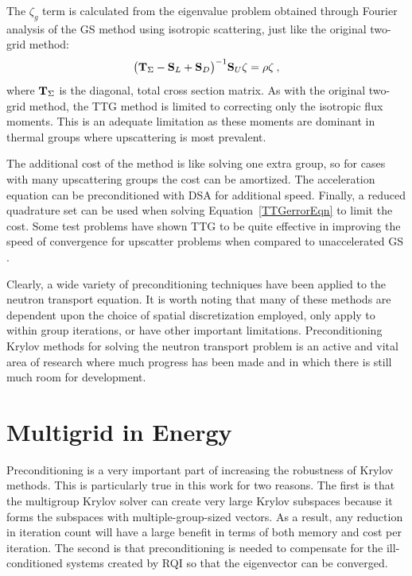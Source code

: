 The $\zeta_g$ term is calculated from the eigenvalue problem obtained through Fourier analysis of the GS method using isotropic scattering, just like the original two-grid method:
%
\begin{equation}
  \bigl(\mathbf{T}_{\Sigma} - \mathbf{S}_L + \mathbf{S}_D\bigr)^{-1} \mathbf{S}_U\zeta = \rho\zeta \:,
\end{equation}
where $\mathbf{T}_{\Sigma}$ is the diagonal, total cross section matrix. As with the original two-grid method, the TTG method is limited to correcting only the isotropic flux moments. This is an adequate limitation as these moments are dominant in thermal groups where upscattering is most prevalent\cite{Evans2009d}.   

The additional cost of the method is like solving one extra group, so for cases with many upscattering groups the cost can be amortized. The acceleration equation can be preconditioned with DSA for additional speed. Finally, a reduced quadrature set can be used when solving Equation~\eqref{TTGerrorEqn} to limit the cost. Some test problems have shown TTG to be quite effective in improving the speed of convergence for upscatter problems when compared to unaccelerated GS \cite{Evans2009d}.

Clearly, a wide variety of preconditioning techniques have been applied to the neutron transport equation. It is worth noting that many of these methods are dependent upon the choice of spatial discretization employed, only apply to within group iterations, or have other important limitations. Preconditioning Krylov methods for solving the neutron transport problem is an active and vital area of research where much progress has been made and in which there is still much room for development. 

\section{Multigrid in Energy}
Preconditioning is a very important part of increasing the robustness of Krylov methods. This is particularly true in this work for two reasons. The first is that the multigroup Krylov solver can create very large Krylov subspaces because it forms the subspaces with multiple-group-sized vectors. As a result, any reduction in iteration count will have a large benefit in terms of both memory and cost per iteration. The second is that preconditioning is needed to compensate for the ill-conditioned systems created by RQI so that the eigenvector can be converged. 

